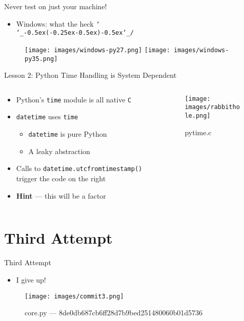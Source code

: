 \documentclass[10pt]{beamer}
\def\shrug{\texttt{\raisebox{0.75em}{\char`\_}\char`\\\char`\_\kern-0.5ex(\kern-0.25ex\raisebox{0.25ex}{\rotatebox{45}{\raisebox{-.75ex}"\kern-1.5ex\rotatebox{-90})}}\kern-0.5ex)\kern-0.5ex\char`\_/\raisebox{0.75em}{\char`\_}}}
\begin{document}
\begin{frame}{Never test on just your machine!}
	\begin{itemize}
		\item Windows: what the heck \shrug
	\end{itemize}
	\begin{figure}
		\texttt{[image: images/windows-py27.png]}
		\vspace{1cm}
		\texttt{[image: images/windows-py35.png]}
	\end{figure}
\end{frame}

\begin{frame}{Lesson 2: Python Time Handling is System Dependent}
	\begin{columns}
		\begin{column}{0.5 \textwidth}
			\begin{itemize}
				\item Python's \texttt{time} module is all native \texttt{C}
				\item \texttt{datetime} uses \texttt{time}
					\begin{itemize}
						\item \texttt{datetime} is pure Python
						\item A leaky abstraction
					\end{itemize}
				\item Calls to \texttt{datetime.utcfromtimestamp()} trigger the code on the right
				\item \textbf{Hint} --- this will be a factor
			\end{itemize}
		\end{column}
		\begin{column}{0.5 \textwidth}
			\begin{figure}
				\texttt{[image: images/rabbithole.png]}
				\caption{pytime.c}
			\end{figure}
		\end{column}
	\end{columns}
\end{frame}

\section{Third Attempt}
\begin{frame}{Third Attempt}
	\begin{itemize}
		\item I give up!
	\end{itemize}
	\begin{figure}
		\centering
		\texttt{[image: images/commit3.png]}
		\caption{core.py --- 8de0db687cb6ff28d7b9bed251480060b01d5736}
	\end{figure}
\end{frame}
\end{document}
